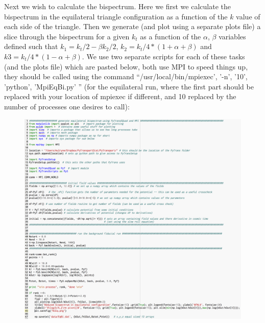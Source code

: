 \documentclass[10pt,
amsmath,amssymb,
aps,prd,nofootinbib,eqsecnum,a4paper]{revtex4}
\begin{document}
Next we wish to calculate the bispectrum. Here we first we calculate the bispectrum 
in the equilateral triangle configuration as a function of the $k$ value of each 
side of the triangle. Then 
we generate (and plot using a separate plots file) a slice through the bispectrum for a given 
$k_t$ as a function of the $\alpha$, $\beta$ variables defined such that $k_1 = k_t/2 - \beta  k_2/2$, 
$ k_2 = k_t/4*(1+\alpha+\beta)$ and $k3 = k_t/4*(1-\alpha+\beta)$. 
We use two separate scripts for each of these tasks (and the plots file) which are pasted below, 
both use MPI to speed 
things up, they should be called 
using the command ``/usr/local/bin/mpiexec', '-n', '10', 'python', 'MpiEqBi.py' '' 
 (for the equilateral run, where the first part 
should be replaced 
with your location of mpiexec if different, and 10 replaced by the number of processes one desires to call): 
\begin{figure}[H]
\centering
\includegraphics[width=18cm]{shot7}
\end{figure}
\end{document}
